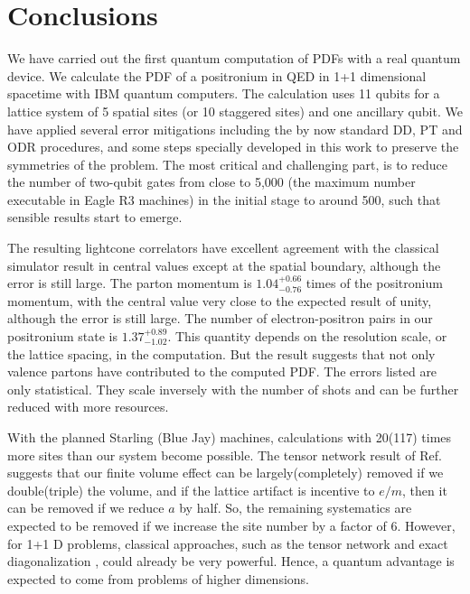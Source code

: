 \documentclass[aps,prd,twocolumn,tightenlines,superscriptaddress,
nofootinbib,preprintnumbers]{revtex4-1}
\begin{document}
\section{Conclusions}

We have carried out the first quantum computation of PDFs with a real quantum device. 
We calculate the PDF of a positronium in QED in 1+1 dimensional spacetime with IBM quantum computers. The calculation uses 11 qubits for a lattice system of 5 spatial sites (or 10 staggered sites) and one ancillary qubit. We have applied several error mitigations including the by now standard DD, PT and ODR procedures, and some steps specially developed in this work to preserve the symmetries of the problem. The most critical and challenging part, is to reduce the number of two-qubit gates from close to 5,000 (the maximum number executable in Eagle R3 machines) in the initial stage to around 500, such that sensible results start to emerge. 

The resulting lightcone correlators have excellent agreement with the classical simulator result in central values except at the spatial boundary, although the error is still large. 
The parton momentum is $1.04^{+0.66}_{-0.76}$ times of the positronium momentum, with the central value very close to the expected result of unity, although the error is still large. The number of electron-positron pairs in our positronium state is $1.37^{+0.89}_{-1.02}$. This quantity depends on the resolution scale, or the lattice spacing, in the computation. But the result suggests that not only valence partons have contributed to the computed PDF. The errors listed are only statistical. They scale inversely with the number of shots and can be further reduced with more resources. 

With the planned Starling (Blue Jay) machines, calculations with 20(117) times more sites than our system become possible. The tensor network result of Ref. \cite{Banuls:2025wiq}  suggests that our finite volume effect can be largely(completely) removed if we double(triple) the volume, and if the lattice artifact is incentive to $e/m$, then it can be removed if we reduce $a$ by half. So, the remaining systematics are expected to be removed if we increase the site number by a factor of 6.
However, for 1+1 D problems, classical approaches, such as the tensor network \cite{
Schneider:2024yub,
Kang:2025xpz, Banuls:2025wiq} and exact diagonalization \cite{Grieninger:2024cdl}, could already be very powerful. Hence, a quantum advantage is expected to come from problems of higher dimensions. 
\end{document}
